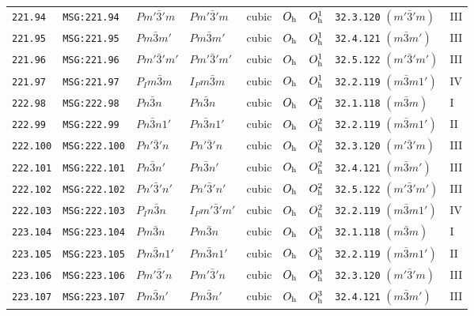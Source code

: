 \documentclass[fleqn,10pt]{jsarticle}
\begin{document}
\begin{center}
\begin{longtable}{lllllllll}
\texttt{221.94} & \texttt{MSG:221.94} & $Pm'\bar{3}'m$ & $Pm'\bar{3}'m$ & cubic & $O_{\rm h}$ & $O_{\rm h}^{1}$ & \texttt{32.3.120} $(m'\bar{3}'m)$ & III \\
\texttt{221.95} & \texttt{MSG:221.95} & $Pm\bar{3}m'$ & $Pm\bar{3}m'$ & cubic & $O_{\rm h}$ & $O_{\rm h}^{1}$ & \texttt{32.4.121} $(m\bar{3}m')$ & III \\
\texttt{221.96} & \texttt{MSG:221.96} & $Pm'\bar{3}'m'$ & $Pm'\bar{3}'m'$ & cubic & $O_{\rm h}$ & $O_{\rm h}^{1}$ & \texttt{32.5.122} $(m'\bar{3}'m')$ & III \\
\texttt{221.97} & \texttt{MSG:221.97} & $P_{I}m\bar{3}m$ & $I_{P}m\bar{3}m$ & cubic & $O_{\rm h}$ & $O_{\rm h}^{1}$ & \texttt{32.2.119} $(m\bar{3}m1')$ & IV \\ \hline
\texttt{222.98} & \texttt{MSG:222.98} & $Pn\bar{3}n$ & $Pn\bar{3}n$ & cubic & $O_{\rm h}$ & $O_{\rm h}^{2}$ & \texttt{32.1.118} $(m\bar{3}m)$ & I \\
\texttt{222.99} & \texttt{MSG:222.99} & $Pn\bar{3}n1'$ & $Pn\bar{3}n1'$ & cubic & $O_{\rm h}$ & $O_{\rm h}^{2}$ & \texttt{32.2.119} $(m\bar{3}m1')$ & II \\
\texttt{222.100} & \texttt{MSG:222.100} & $Pn'\bar{3}'n$ & $Pn'\bar{3}'n$ & cubic & $O_{\rm h}$ & $O_{\rm h}^{2}$ & \texttt{32.3.120} $(m'\bar{3}'m)$ & III \\
\texttt{222.101} & \texttt{MSG:222.101} & $Pn\bar{3}n'$ & $Pn\bar{3}n'$ & cubic & $O_{\rm h}$ & $O_{\rm h}^{2}$ & \texttt{32.4.121} $(m\bar{3}m')$ & III \\
\texttt{222.102} & \texttt{MSG:222.102} & $Pn'\bar{3}'n'$ & $Pn'\bar{3}'n'$ & cubic & $O_{\rm h}$ & $O_{\rm h}^{2}$ & \texttt{32.5.122} $(m'\bar{3}'m')$ & III \\
\texttt{222.103} & \texttt{MSG:222.103} & $P_{I}n\bar{3}n$ & $I_{P}m'\bar{3}'m'$ & cubic & $O_{\rm h}$ & $O_{\rm h}^{2}$ & \texttt{32.2.119} $(m\bar{3}m1')$ & IV \\ \hline
\texttt{223.104} & \texttt{MSG:223.104} & $Pm\bar{3}n$ & $Pm\bar{3}n$ & cubic & $O_{\rm h}$ & $O_{\rm h}^{3}$ & \texttt{32.1.118} $(m\bar{3}m)$ & I \\
\texttt{223.105} & \texttt{MSG:223.105} & $Pm\bar{3}n1'$ & $Pm\bar{3}n1'$ & cubic & $O_{\rm h}$ & $O_{\rm h}^{3}$ & \texttt{32.2.119} $(m\bar{3}m1')$ & II \\
\texttt{223.106} & \texttt{MSG:223.106} & $Pm'\bar{3}'n$ & $Pm'\bar{3}'n$ & cubic & $O_{\rm h}$ & $O_{\rm h}^{3}$ & \texttt{32.3.120} $(m'\bar{3}'m)$ & III \\
\texttt{223.107} & \texttt{MSG:223.107} & $Pm\bar{3}n'$ & $Pm\bar{3}n'$ & cubic & $O_{\rm h}$ & $O_{\rm h}^{3}$ & \texttt{32.4.121} $(m\bar{3}m')$ & III \\

\end{longtable}
\end{center}
\end{document}
